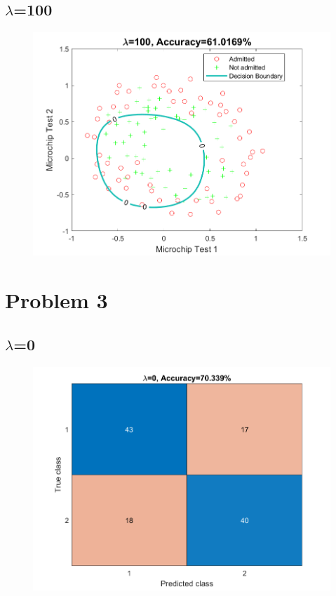 \documentclass{article}
\begin{document}
\subsection*{{$\lambda$}=100}


\begin{figure}[H]
\includegraphics[scale = 0.75]{hwk4_problem2_lambda_100_plot.png}
\end{figure}

\newpage
\section*{Problem 3}
\subsection*{{$\lambda$}=0}


\begin{figure}[H]
\includegraphics[scale = 0.75]{hwk4_problem3_lambda_0_plot.png}
\end{figure}
\end{document}
